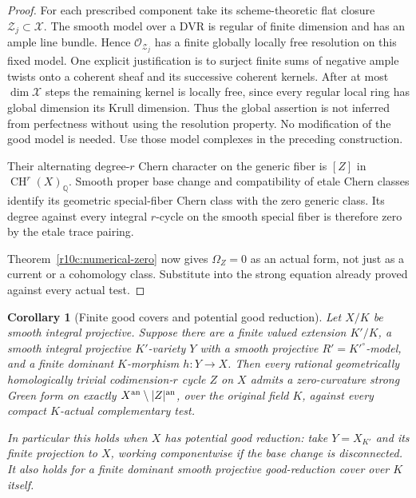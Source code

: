 \documentclass[11pt]{article}
\newtheorem{corollary}[theorem]{Corollary}
\theoremstyle{definition}
\theoremstyle{remark}
\numberwithin{equation}{section}
\begin{document}
\begin{proof}
For each prescribed component take its scheme-theoretic flat closure
$\mathcal Z_j\subset\mathcal X$.  The smooth model over a DVR is regular
of finite dimension and has an ample line bundle.  Hence
$\mathcal O_{\mathcal Z_j}$ has a finite globally locally free
resolution on this fixed model.  One explicit justification is to
surject finite sums of negative ample twists onto a coherent sheaf
and its successive coherent kernels.  After at most $\dim\mathcal X$
steps the remaining kernel is locally free, since every regular
local ring has global dimension its Krull dimension.  Thus the
global assertion is not inferred from perfectness without using the
resolution property.  No modification of the good model
is needed.  Use those model complexes in the preceding construction.

Their alternating degree-$r$ Chern character on the generic fiber
is $[Z]$ in $\operatorname{CH}^r(X)_{\mathbb Q}$.  Smooth proper
base change and compatibility of etale Chern classes identify its
geometric special-fiber Chern class with the zero generic class.
Its degree against every integral $r$-cycle on the smooth special
fiber is therefore zero by the etale trace pairing.

Theorem~\ref{r10c:numerical-zero} now gives
$\Omega_Z=0$ as an actual form, not just as a current or a
cohomology class.  Substitute into the strong equation already
proved against every actual test.
\end{proof}

\begin{corollary}[Finite good covers and potential good reduction]
\label{r11p:potential-good-G}
Let $X/K$ be smooth integral projective.  Suppose there are a finite
valued extension $K'/K$, a smooth integral projective $K'$-variety
$Y$ with a smooth projective $R'=K'^\circ$-model, and a finite
dominant $K$-morphism $h:Y\to X$.  Then every rational geometrically
homologically trivial codimension-$r$ cycle $Z$ on $X$ admits a
zero-curvature strong Green form on exactly
$X^{\rm an}\setminus|Z|^{\rm an}$, over the original field $K$,
against every compact $K$-actual complementary test.

In particular this holds when $X$ has potential good reduction:
take $Y=X_{K'}$ and its finite projection to $X$, working componentwise
if the base change is disconnected.
It also holds for a finite dominant smooth projective good-reduction
cover over $K$ itself.
\end{corollary}
\end{document}

